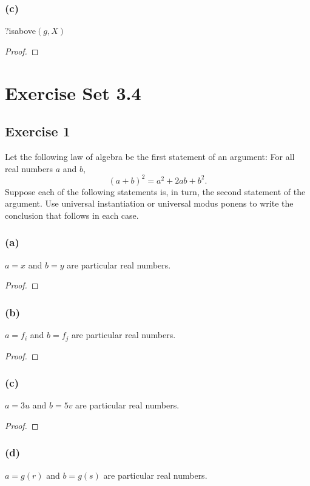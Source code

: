 \documentclass[14pt]{extarticle}
\begin{document}
\subsubsection{(c)}
?isabove$(g, X)$

\begin{proof}

\end{proof}

\section{Exercise Set 3.4}

\subsection{Exercise 1}
Let the following law of algebra be the first statement of an argument: For all real numbers $a$ and $b$, 
$$
(a + b)^2 = a^2 + 2ab + b^2. 
$$
Suppose each of the following statements is, in turn, the second statement of the argument. Use universal instantiation or universal modus ponens to write the conclusion that follows in each case.

\subsubsection{(a)}
$a = x$ and $b = y$ are particular real numbers.

\begin{proof}

\end{proof}

\subsubsection{(b)}
$a = f_i$ and $b = f_j$ are particular real numbers.

\begin{proof}

\end{proof}

\subsubsection{(c)}
$a = 3u$ and $b = 5v$ are particular real numbers.

\begin{proof}

\end{proof}

\subsubsection{(d)}
$a = g(r)$ and $b = g(s)$ are particular real numbers.
\end{document}
